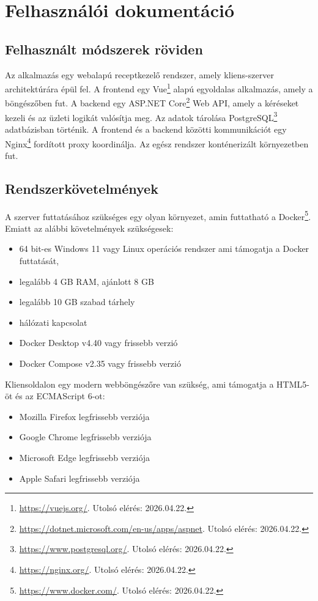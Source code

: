 ﻿\chapter{Felhasználói dokumentáció}\label{ch:problem-definition}

\section{Felhasznált módszerek röviden}

Az alkalmazás egy webalapú receptkezelő rendszer, amely kliens-szerver architektúrára épül fel. A frontend egy Vue\footnote{\url{https://vuejs.org/}. Utolsó elérés: 2026.04.22.} alapú egyoldalas alkalmazás, amely a böngészőben fut. A backend egy ASP.NET Core\footnote{\url{https://dotnet.microsoft.com/en-us/apps/aspnet}. Utolsó elérés: 2026.04.22.} Web API, amely a kéréseket kezeli és az üzleti logikát valósítja meg. Az adatok tárolása PostgreSQL\footnote{\url{https://www.postgresql.org/}. Utolsó elérés: 2026.04.22.} adatbázisban történik. A frontend és a backend közötti kommunikációt egy Nginx\footnote{\url{https://nginx.org/}. Utolsó elérés: 2026.04.22.} fordított proxy koordinálja. Az egész rendszer konténerizált környezetben fut.

\section{Rendszerkövetelmények}

A szerver futtatásához szükséges egy olyan környezet, amin futtatható a Docker\footnote{\url{https://www.docker.com/}. Utolsó elérés: 2026.04.22.}. Emiatt az alábbi követelmények szükségesek:
\begin{itemize}
	\item 64 bit-es Windows 11 vagy Linux operációs rendszer ami támogatja a Docker futtatását,
	\item legalább 4 GB RAM, ajánlott 8 GB
	\item legalább 10 GB szabad tárhely
	\item hálózati kapcsolat
	\item Docker Desktop v4.40 vagy frissebb verzió
	\item Docker Compose v2.35 vagy frissebb verzió
\end{itemize}

Kliensoldalon egy modern webböngészőre van szükség, ami támogatja a HTML5-öt és az ECMAScript 6-ot:
\begin{itemize}
	\item Mozilla Firefox legfrissebb verziója
	\item Google Chrome legfrissebb verziója
	\item Microsoft Edge legfrissebb verziója
	\item Apple Safari legfrissebb verziója
\end{itemize}

